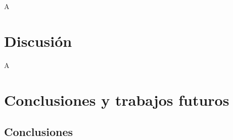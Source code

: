 \documentclass[IB,BIB]{TFUOC}%
\begin{document}


% 

A




\chapter{Discusión}
\label{chap:Discusión}


A




\chapter{Conclusiones y trabajos futuros}
\label{chap:Conclusiones y trabajos futuros}

\section{Conclusiones}
\label{sec:Conclusiones}
\end{document}
